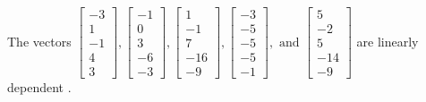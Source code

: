 \begin{exercise}
\begin{exerciseStatement}
  \end{exerciseStatement}
  \begin{exerciseAnswer}
   The vectors \(\left[\begin{array}{r}
-3 \\
1 \\
-1 \\
4 \\
3
\end{array}\right] , \left[\begin{array}{r}
-1 \\
0 \\
3 \\
-6 \\
-3
\end{array}\right] , \left[\begin{array}{r}
1 \\
-1 \\
7 \\
-16 \\
-9
\end{array}\right] , \left[\begin{array}{r}
-3 \\
-5 \\
-5 \\
-5 \\
-1
\end{array}\right] , \text{ and } \left[\begin{array}{r}
5 \\
-2 \\
5 \\
-14 \\
-9
\end{array}\right]\) are 
  	 linearly dependent  .
  


  \end{exerciseAnswer}
\end{exercise}